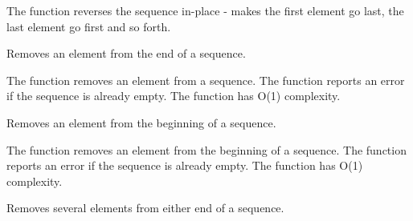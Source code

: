 
\begin{description}
\end{description}


The function reverses the sequence in-place - makes the first element go last, the last element go first and so forth.

\ifC

Removes an element from the end of a sequence.


\begin{description}
\end{description}

The function removes an element from a sequence. The function reports an error if the sequence is already empty. The function has O(1) complexity.

Removes an element from the beginning of a sequence.


\begin{description}
\end{description}

The function removes an element from the beginning of a sequence. The function reports an error if the sequence is already empty. The function has O(1) complexity.

Removes several elements from either end of a sequence.


